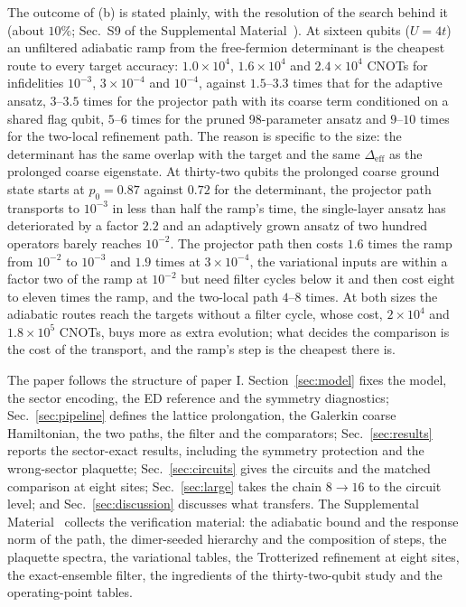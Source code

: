 \documentclass[a4paper,11pt,noarxiv]{quantumarticle}
\newcommand{\Deff}{\Delta_{\mathrm{eff}}}
\newcommand{\SM}{Supplemental Material~\cite{SM}}
\begin{document}
The outcome of (b) is stated plainly, with the resolution of the search
behind it (about $10\%$; Sec.~S9 of the \SM{}).  At sixteen qubits
($U=4t$) an unfiltered adiabatic ramp from the free-fermion determinant is
the cheapest route to every target accuracy: $1.0\times10^4$,
$1.6\times10^4$ and $2.4\times10^4$ CNOTs for infidelities $10^{-3}$,
$3\times10^{-4}$ and $10^{-4}$, against $1.5$--$3.3$ times that for the
adaptive ansatz, $3$--$3.5$ times for the projector path with its coarse
term conditioned on a shared flag qubit, $5$--$6$ times for the pruned
98-parameter ansatz and $9$--$10$ times for the two-local refinement path.
The reason is specific to the size: the determinant has the same overlap
with the target and the same $\Deff$ as the prolonged coarse eigenstate.
At thirty-two qubits the prolonged coarse ground state starts at
$p_0=0.87$ against $0.72$ for the determinant, the projector path
transports to $10^{-3}$ in less than half the ramp's time, the
single-layer ansatz has deteriorated by a factor $2.2$ and an adaptively
grown ansatz of two hundred operators barely reaches $10^{-2}$.  The
projector path then costs $1.6$ times the ramp from $10^{-2}$ to
$10^{-3}$ and $1.9$ times at $3\times10^{-4}$, the variational inputs are
within a factor two of the ramp at $10^{-2}$ but need filter cycles below
it and then cost eight to eleven times the ramp, and the two-local path
$4$--$8$ times.  At both sizes the adiabatic routes reach the targets
without a filter cycle, whose cost, $2\times10^4$ and $1.8\times10^5$
CNOTs, buys more as extra evolution; what decides the comparison is the
cost of the transport, and the ramp's step is the cheapest there is.

The paper follows the structure of paper I.  Section~\ref{sec:model} fixes
the model, the sector encoding, the ED reference and the symmetry
diagnostics; Sec.~\ref{sec:pipeline} defines the lattice prolongation, the
Galerkin coarse Hamiltonian, the two paths, the filter and the comparators;
Sec.~\ref{sec:results} reports the sector-exact results, including the
symmetry protection and the wrong-sector plaquette; Sec.~\ref{sec:circuits}
gives the circuits and the matched comparison at eight sites;
Sec.~\ref{sec:large} takes the chain $8\to16$ to the circuit level; and
Sec.~\ref{sec:discussion} discusses what transfers.  The \SM{} collects the
verification material: the adiabatic bound and the response norm of the
path, the dimer-seeded hierarchy and the composition of steps, the plaquette
spectra, the variational tables, the Trotterized refinement at eight sites,
the exact-ensemble filter, the ingredients of the thirty-two-qubit study and
the operating-point tables.
\end{document}
